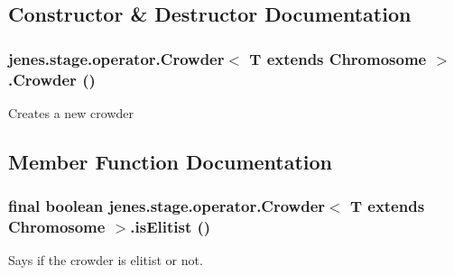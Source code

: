 \subsection{Constructor \& Destructor Documentation}
\hypertarget{classjenes_1_1stage_1_1operator_1_1_crowder_3_01_t_01extends_01_chromosome_01_4_6e23e3544b98e1a415c53fcedd541df5}{
\subsubsection[Crowder]{\setlength{\rightskip}{0pt plus 5cm}jenes.stage.operator.Crowder$<$ T extends Chromosome $>$.Crowder ()}}
\label{classjenes_1_1stage_1_1operator_1_1_crowder_3_01_t_01extends_01_chromosome_01_4_6e23e3544b98e1a415c53fcedd541df5}


Creates a new crowder 

\subsection{Member Function Documentation}
\hypertarget{classjenes_1_1stage_1_1operator_1_1_crowder_3_01_t_01extends_01_chromosome_01_4_b9bb2a8d6bf09a51158ef49917095913}{
\subsubsection[isElitist]{\setlength{\rightskip}{0pt plus 5cm}final boolean jenes.stage.operator.Crowder$<$ T extends Chromosome $>$.isElitist ()}}
\label{classjenes_1_1stage_1_1operator_1_1_crowder_3_01_t_01extends_01_chromosome_01_4_b9bb2a8d6bf09a51158ef49917095913}


Says if the crowder is elitist or not.

